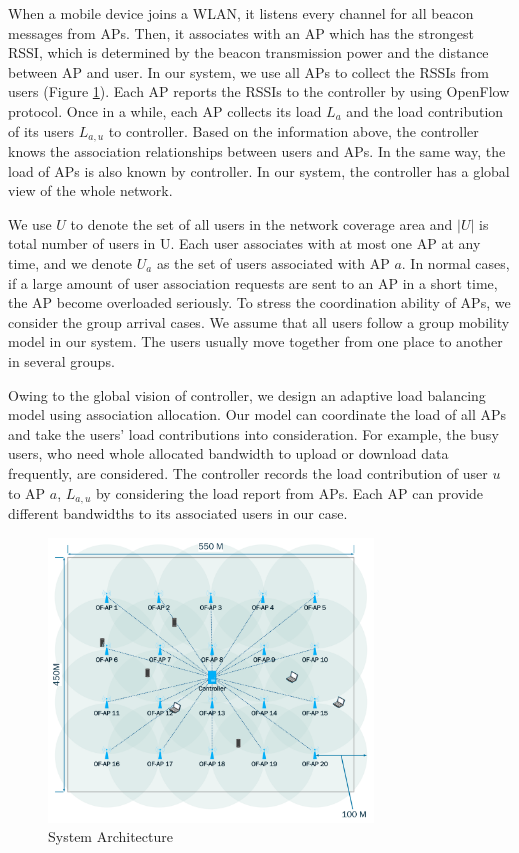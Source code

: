 When a mobile device joins a WLAN, it listens every channel for all beacon messages from APs. Then, it associates with an AP which has the strongest RSSI, which is determined by the beacon transmission power and the distance between AP and user. In our system, we use all APs to collect the RSSIs from users  (Figure \ref{fig:scheme1}). Each AP reports the RSSIs to the controller by using OpenFlow protocol. Once in a while, each AP collects its load $L_a$  and the load contribution of its users $L_{a,u}$  to controller. Based on the information above, the controller knows the association relationships between users and APs. In the same way, the load of APs is also known by controller. In our system, the controller has a global view of the whole network.

We use $U$ to denote the set of all users in the network coverage area and $|U|$ is total number of users in U. Each user associates with at most one AP at any time, and we denote $U_a$ as the set of users associated with AP $a$. In normal cases, if a large amount of user association requests are sent to an AP in a short time, the AP become overloaded seriously. To stress the coordination ability of APs, we consider the group arrival cases. We assume that all users follow a group mobility model in our system. The users usually move together from one place to another in several groups.

Owing to the global vision of controller, we design an adaptive load balancing model using association allocation. Our model can coordinate the load of all APs and take the users' load contributions into consideration. For example, the busy users, who need whole allocated bandwidth to upload or download data frequently, are considered. The controller records the load contribution of user $u$ to AP $a$, $L_{a,u}$ by considering the load report from APs. Each AP can provide different bandwidths to its associated users in our case.


\begin{figure}[tbp]
\begin{center}
\includegraphics[width=3.4in]{images/scheme1.pdf}
\end{center}
\caption{System Architecture}
\label{fig:scheme1}
\end{figure}

